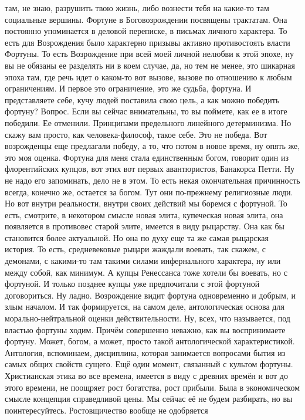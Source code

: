 там, не знаю, разрушить твою жизнь, либо вознести тебя на какие-то там
социальные вершины. Фортуне в Боговозрождении посвящены трактатам. Она постоянно
упоминается в деловой переписке, в письмах личного характера. То есть для
Возрождения было характерно призывы активно противостоять власти Фортуны. То
есть Возрождение при всей моей личной нелюбви к этой эпохе, ну вы не обязаны ее
разделять ни в коем случае, да, но тем не менее, это шикарная эпоха там, где
речь идет о каком-то вот вызове, вызове по отношению к любым ограничениям. И
первое это ограничение, это же судьба, фортуна. И представляете себе, кучу людей
поставила свою цель, а как можно победить фортуну? Вопрос. Если вы сейчас
внимательны, то вы поймете, как ее в итоге победили. Ее отменили. Принципами
предельного линейного детерминизма. Но скажу вам просто, как человека-философ,
такое себе. Это не победа. Вот возрожденцы еще предлагали победу, а то, что
потом в новое время, ну опять же, это моя оценка. Фортуна для меня стала
единственным богом, говорит один из флорентийских купцов, вот этих вот первых
авантюристов, Банакорса Петти. Ну не надо его запоминать, дело не в этом. То
есть некая окончательная причинность всегда, конечно же, остается за богом. Тут
они по-прежнему религиозные люди. Но вот внутри реальности, внутри своих
действий мы боремся с фортуной. То есть, смотрите, в некотором смысле новая
элита, купеческая новая элита, она появляется в противовес старой элите, имеется
в виду рыцарству. Она как бы становится более актуальной. Но она по духу еще та
же самая рыцарская история. То есть, средневековые рыцари жаждали воевать, так
скажем, с демонами, с какими-то там такими силами инфернального характера, ну
или между собой, как минимум. А купцы Ренессанса тоже хотели бы воевать, но с
фортуной. И только позднее купцы уже предпочитали с этой фортуной договориться.
Ну ладно. Возрождение видит фортуна одновременно и добрым, и злым началом. И так
формируется, на самом деле, антологическая основа для морально-нейтральной
оценки действительности. Ну, всех, что называется, под властью фортуны ходим.
Причём совершенно неважно, как вы воспринимаете фортуну. Может, богом, а может,
просто такой антологической характеристикой. Антология, вспоминаем, дисциплина,
которая занимается вопросами бытия из самых общих свойств сущего. Ещё один
момент, связанный с культом фортуны. Христианская этика во все времена, имеется
в виду с древних времён и вот до этого времени, не поощряет рост богатства, рост
прибыли. Была в экономическом смысле концепция справедливой цены. Мы сейчас её
не будем разбирать, но вы поинтересуйтесь. Ростовщичество вообще не одобряется

